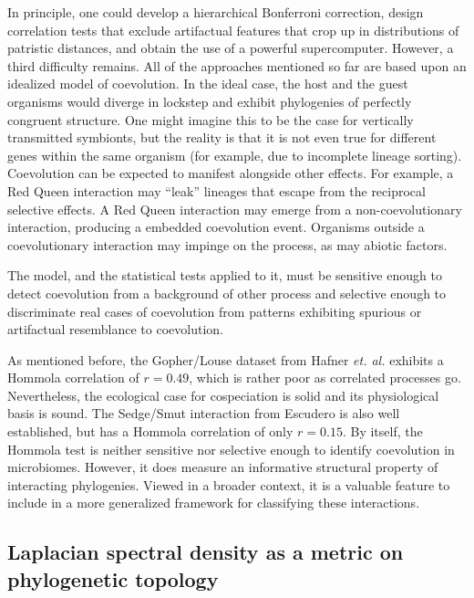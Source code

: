 

In principle, one could develop a hierarchical Bonferroni correction, design correlation tests that exclude artifactual features that crop up in distributions of patristic distances, and obtain the use of a powerful supercomputer. However, a third difficulty remains. All of the approaches mentioned so far are based upon an idealized model of coevolution. In the ideal case, the host and the guest organisms would diverge in lockstep and exhibit phylogenies of perfectly congruent structure. One might imagine this to be the case for vertically transmitted symbionts, but the reality is that it is not even true for different genes within the same organism (for example, due to incomplete lineage sorting). Coevolution can be expected to manifest alongside other effects. For example, a Red Queen interaction may ``leak'' lineages that escape from the reciprocal selective effects. A Red Queen interaction may emerge from a non-coevolutionary interaction, producing a embedded coevolution event. Organisms outside a coevolutionary interaction may impinge on the process, as may abiotic factors.

The model, and the statistical tests applied to it, must be sensitive enough to detect coevolution from a background of other process and selective enough to discriminate real cases of coevolution from patterns exhibiting spurious or artifactual resemblance to coevolution.

As mentioned before, the Gopher/Louse dataset from Hafner {\em et. al.} exhibits a Hommola correlation of $r=0.49$, which is rather poor as correlated processes go. Nevertheless, the ecological case for cospeciation is solid and its physiological basis is sound. The Sedge/Smut interaction from Escudero \cite{escudero2015phylogenetic} is also well established, but has a Hommola correlation of only $r=0.15$. By itself, the Hommola test is neither sensitive nor selective enough to identify coevolution in microbiomes. However, it does measure an informative structural property of interacting phylogenies. Viewed in a broader context, it is a valuable feature to include in a more generalized framework for classifying these interactions.

\subsection{Laplacian spectral density as a metric on phylogenetic topology}\label{FP_spectral_summary}


